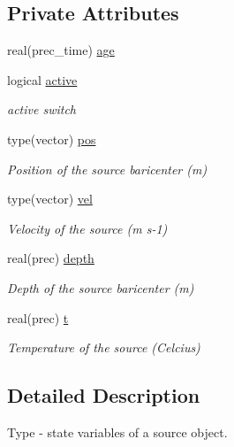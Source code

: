 \subsection*{Private Attributes}
\begin{DoxyCompactItemize}
\item 
real(prec\+\_\+time) \mbox{\hyperlink{structsources__mod_1_1source__state_a4ec18178b2bfbf4769892f26d62aa6f7}{age}}
\item 
logical \mbox{\hyperlink{structsources__mod_1_1source__state_ab31d51c870b76a1e4ca9b03f5847a7c2}{active}}
\begin{DoxyCompactList}\small\item\em active switch \end{DoxyCompactList}\item 
type(vector) \mbox{\hyperlink{structsources__mod_1_1source__state_a8dacf7040158bb5214f66476bf1a1c3d}{pos}}
\begin{DoxyCompactList}\small\item\em Position of the source baricenter (m) \end{DoxyCompactList}\item 
type(vector) \mbox{\hyperlink{structsources__mod_1_1source__state_a52c6f025eb262a7a07b2a8b4ec7065ac}{vel}}
\begin{DoxyCompactList}\small\item\em Velocity of the source (m s-\/1) \end{DoxyCompactList}\item 
real(prec) \mbox{\hyperlink{structsources__mod_1_1source__state_a4dbafcfac12c749efd402a71e01a25cd}{depth}}
\begin{DoxyCompactList}\small\item\em Depth of the source baricenter (m) \end{DoxyCompactList}\item 
real(prec) \mbox{\hyperlink{structsources__mod_1_1source__state_a7d51970a13f9664bbaf9d09afea0b363}{t}}
\begin{DoxyCompactList}\small\item\em Temperature of the source (Celcius) \end{DoxyCompactList}\end{DoxyCompactItemize}


\subsection{Detailed Description}
Type -\/ state variables of a source object. 

